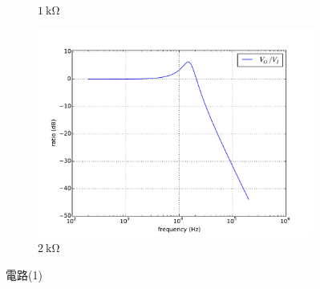 \documentclass[12pt, a4paper]{article}
\begin{document}
\begin{enumerate}[itemsep=20pt, topsep=10pt]
\begin{enumerate}[label=(\alph*)]
\begin{figure}[H]
\begin{subfigure}[b]{0.45\textwidth}
          \caption{$\SI{1}\kohm$}
        \end{subfigure}
        \begin{subfigure}[b]{0.45\textwidth}
          \includegraphics[width=1\textwidth]{circuit/p13.pdf}
          \caption{$\SI{2}\kohm$}
        \end{subfigure}
        \caption{電路(1)}
      \end{figure}


\end{enumerate}
\end{enumerate}
\end{document}
